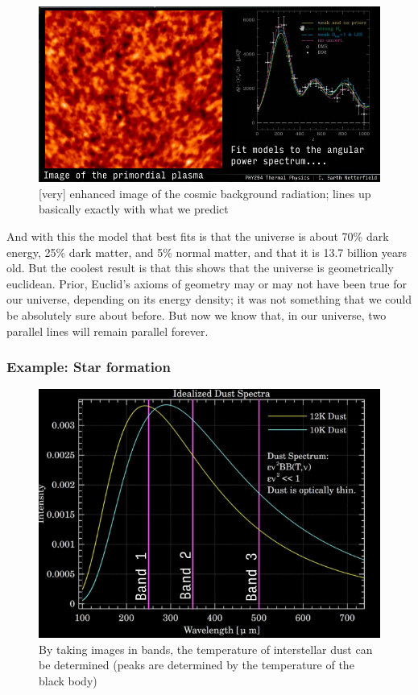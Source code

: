 \documentclass[10pt]{article}
\begin{document}
\begin{figure}[H]
	\centering
	\includegraphics[width=0.8\linewidth]{img/image_2022-04-10-02-12-46.png}
	\caption{[very] enhanced image of the cosmic background radiation; lines up basically exactly with what we predict}
\end{figure}

And with this the model that best fits is that the universe is about 70\% dark energy, 25\% dark matter, and 5\% normal matter, and that it is 13.7 billion years old.
But the coolest result is that this shows that the universe is geometrically euclidean.
Prior, Euclid's axioms of geometry may or may not have been true for our universe, depending on its energy density; it was not something that we could be absolutely sure about before.
But now we know that, in our universe, two parallel lines will remain parallel forever.





\subsubsection{Example: Star formation}


\begin{figure}[H]
	\centering
	\includegraphics[width=0.8\linewidth]{img/image_2022-04-10-02-09-35.png}
	\caption{By taking images in bands, the temperature of interstellar dust can be determined (peaks are determined by the temperature of the black body)}
\end{figure}
\end{document}
